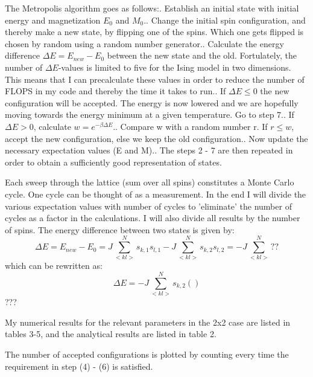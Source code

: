 \documentclass[twocolumn]{article}
\begin{document}
The Metropolis algorithm goes as follows:. Establish an initial state  with initial energy and magnetization $E_0$ and $M_0$.. Change the initial spin configuration, and thereby make a new state, by flipping one of the spins. Which one gets flipped is chosen by random using a random number generator.. Calculate the energy difference $\Delta E = E_{new} - E_0$ between the new state and the old. Fortulately, the number of $\Delta E$-values is limited to five for the Ising model in two dimensions. This means that I can precalculate these values in order to reduce the number of FLOPS in my code and thereby the time it takes to run.. If $\Delta E \leq 0$ the new configuration will be accepted. The energy is now lowered and we are hopefully moving towards the energy minimum at a given temperature. Go to step 7.. If $\Delta E > 0$, calculate $w = e^{-\beta \Delta E}$.. Compare w with a random number r. If $r \leq w$, accept the new configuration, else we keep the old configuration.. Now update the necessary expectation values (E and M).. The steps 2 - 7 are then repeated in order to obtain a sufficiently good representation of states.\newline

Each sweep through the lattice (sum over all spins) constitutes a Monte Carlo cycle. One cycle can be thought of as a measurement. In the end I will divide the various expectation values with number of cycles to 'eliminate' the number of cycles as a factor in the calculations. I will also divide all results by the number of spins.\newline
The energy difference between two states is given by: $$\Delta E = E_{new} - E_0 = J \sum_{<kl>}^{N} s_{k,1}s_{l,1} - J\sum_{<kl>}^{N} s_{k,2}s_{l,2} = - J\sum_{<kl>}^{N} ??$$ which can be rewritten as: $$\Delta E = -J \sum_{<kl>}^{N} s_{k,2}() $$ ???\newline

My numerical results for the relevant parameters in the 2x2 case are listed in tables 3-5, and the analytical results are listed in table 2.
\newline

The number of accepted configurations is plotted by counting every time the requirement in step (4) - (6) is satisfied.\newline
\end{document}
